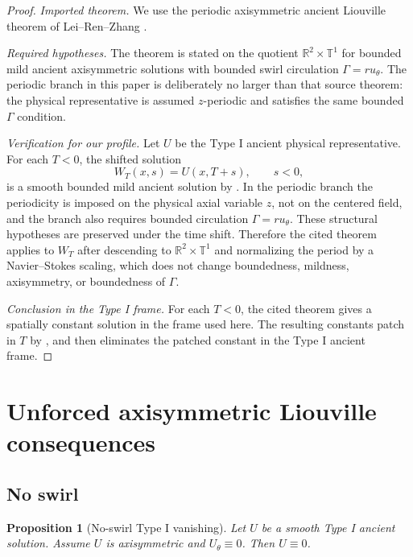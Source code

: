 \documentclass[11pt]{amsart}
\theoremstyle{plain}
\newtheorem{proposition}[proposition]{Proposition}
\theoremstyle{definition}
\theoremstyle{remark}
\numberwithin{equation}{section}
\newcommand{\R}{\mathbb R}
\begin{document}
\begin{proof}
\smallskip
\noindent\emph{Imported theorem.}
We use the periodic axisymmetric ancient Liouville theorem of
Lei--Ren--Zhang \cite[Theorem 1.1]{LRZ}.

\smallskip
\noindent\emph{Required hypotheses.}
The theorem is stated on the quotient
\(\R^2\times\mathbb T^1\) for bounded mild ancient axisymmetric solutions with
bounded swirl circulation \(\Gamma=ru_\theta\).  The periodic branch in this
paper is deliberately no larger than that source theorem: the physical
representative is assumed \(z\)-periodic and satisfies the same bounded
\(\Gamma\) condition.

\smallskip
\noindent\emph{Verification for our profile.}
Let \(U\) be the Type I ancient physical representative.  For each \(T<0\),
the shifted solution
\[
   W_T(x,s)=U(x,T+s),\qquad s<0,
\]
is a smooth bounded mild ancient solution by .  In
the periodic branch the periodicity is imposed on the physical axial variable
\(z\), not on the centered field, and the branch also requires bounded
circulation \(\Gamma=ru_\theta\).  These structural hypotheses are preserved
under the time shift.  Therefore the cited theorem applies to \(W_T\) after
descending to \(\R^2\times\mathbb T^1\) and normalizing the period by a
Navier--Stokes scaling, which does not change boundedness, mildness,
axisymmetry, or boundedness of \(\Gamma\).

\smallskip
\noindent\emph{Conclusion in the Type I frame.}
For each \(T<0\), the cited theorem gives a spatially constant solution in the
frame used here.  The resulting constants patch in \(T\) by
, and  then
eliminates the patched constant in the Type I ancient frame.
\end{proof}

\section{Unforced axisymmetric Liouville consequences}
\label{p3:sec:axisymmetric-consequences}

\subsection{No swirl}

\begin{proposition}[No-swirl Type I vanishing]\label{p3:prop:noswirl-typeI}
Let \(U\) be a smooth Type I ancient solution.  Assume \(U\) is axisymmetric
and \(U_\theta\equiv0\).  Then \(U\equiv0\).
\end{proposition}
\end{document}
